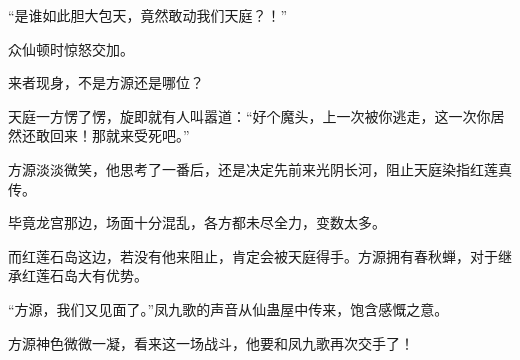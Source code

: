 \begin{this_body}
“是谁如此胆大包天，竟然敢动我们天庭？！”

众仙顿时惊怒交加。

来者现身，不是方源还是哪位？

天庭一方愣了愣，旋即就有人叫嚣道：“好个魔头，上一次被你逃走，这一次你居然还敢回来！那就来受死吧。”

方源淡淡微笑，他思考了一番后，还是决定先前来光阴长河，阻止天庭染指红莲真传。

毕竟龙宫那边，场面十分混乱，各方都未尽全力，变数太多。

而红莲石岛这边，若没有他来阻止，肯定会被天庭得手。方源拥有春秋蝉，对于继承红莲石岛大有优势。

“方源，我们又见面了。”凤九歌的声音从仙蛊屋中传来，饱含感慨之意。

方源神色微微一凝，看来这一场战斗，他要和凤九歌再次交手了！

\end{this_body}

